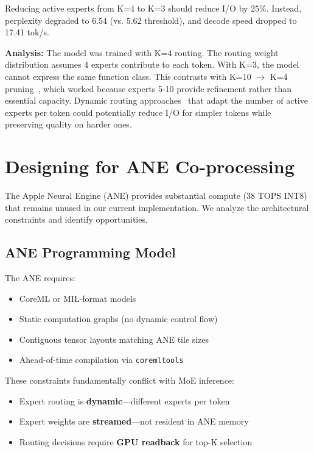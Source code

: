 \documentclass[11pt,twocolumn]{article}
\begin{document}
Reducing active experts from K=4 to K=3 should reduce I/O by 25\%. Instead, perplexity degraded to 6.54 (vs. 5.62 threshold), and decode speed dropped to 17.41 tok/s.

\textbf{Analysis:} The model was trained with K=4 routing. The routing weight distribution assumes 4 experts contribute to each token. With K=3, the model cannot express the same function class. This contrasts with K=10 $\rightarrow$ K=4 pruning~\cite{flashmoe2025}, which worked because experts 5-10 provide refinement rather than essential capacity. Dynamic routing approaches~\cite{dynamicmoe} that adapt the number of active experts per token could potentially reduce I/O for simpler tokens while preserving quality on harder ones.

\section{Designing for ANE Co-processing}

The Apple Neural Engine (ANE) provides substantial compute (38 TOPS INT8) that remains unused in our current implementation. We analyze the architectural constraints and identify opportunities.

\subsection{ANE Programming Model}

The ANE requires:
\begin{itemize}
    \item CoreML or MIL-format models
    \item Static computation graphs (no dynamic control flow)
    \item Contiguous tensor layouts matching ANE tile sizes
    \item Ahead-of-time compilation via \texttt{coremltools}
\end{itemize}

These constraints fundamentally conflict with MoE inference:
\begin{itemize}
    \item Expert routing is \textbf{dynamic}---different experts per token
    \item Expert weights are \textbf{streamed}---not resident in ANE memory
    \item Routing decisions require \textbf{GPU readback} for top-K selection
\end{itemize}
\end{document}
